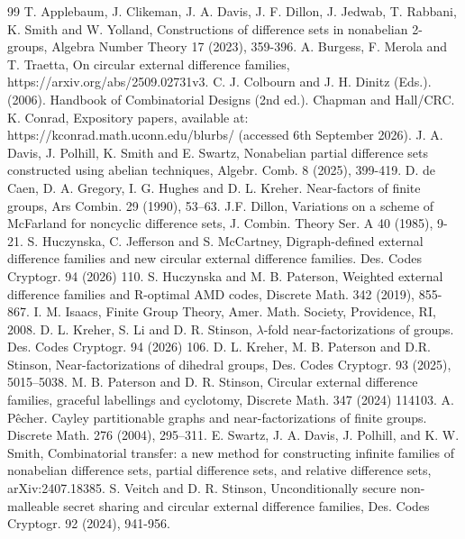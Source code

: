 \documentclass[12pt, a4paper]{article}
\theoremstyle{definition}
\begin{document}
\begin{thebibliography}{99}
 T. Applebaum, J. Clikeman, J. A.  Davis, J. F. Dillon, J. Jedwab, T. Rabbani, K. Smith and W. Yolland, Constructions of difference sets in nonabelian 2-groups, Algebra Number Theory 17 (2023), 359-396.
 A. Burgess, F. Merola and T. Traetta, On circular external difference families,  https://arxiv.org/abs/2509.02731v3.
C. J. Colbourn and J. H. Dinitz (Eds.). (2006). Handbook of Combinatorial Designs (2nd ed.). Chapman and Hall/CRC. 
 K. Conrad, Expository papers, available at: https://kconrad.math.uconn.edu/blurbs/ (accessed 6th September 2026).
 J. A. Davis, J. Polhill, K. Smith and E. Swartz, Nonabelian partial difference sets constructed using abelian techniques, Algebr. Comb. 8 (2025), 399-419.
 D. de Caen, D. A. Gregory, I. G. Hughes and D. L. Kreher. Near-factors of finite groups, Ars Combin. 29 (1990), 53–63.
J.F. Dillon,
Variations on a scheme of McFarland for noncyclic difference sets,
J. Combin. Theory Ser. A
40 (1985), 9-21.
S. Huczynska, C. Jefferson and S. McCartney, Digraph-defined external difference families and new circular external difference families. Des. Codes Cryptogr. 94 (2026) 110.
 S. Huczynska and M. B. Paterson, Weighted external difference families and R-optimal AMD
codes, Discrete Math. 342 (2019), 855-867.
 I. M. Isaacs, Finite Group Theory, Amer. Math. Society, Providence, RI, 2008.
 D. L. Kreher, S. Li and D. R. Stinson, $\lambda$-fold near-factorizations of groups. Des. Codes Cryptogr. 94 (2026) 106. 
 D. L. Kreher, M. B. Paterson and D.R. Stinson, Near-factorizations of dihedral groups, Des. Codes Cryptogr. 93 (2025), 5015--5038.
 M. B. Paterson and D. R. Stinson,
Circular external difference families, graceful labellings and cyclotomy, Discrete Math. 347 (2024) 114103.
 A. P\^echer. Cayley partitionable graphs and near-factorizations of finite groups. Discrete Math. 276 (2004), 295–311.
 E. Swartz, J. A. Davis, J. Polhill, and K. W. Smith, Combinatorial transfer: a new method for constructing infinite families of nonabelian difference sets, partial difference sets, and relative difference sets, arXiv:2407.18385.
 S. Veitch and D. R. Stinson, Unconditionally secure non-malleable secret sharing and
circular external difference families, Des. Codes Cryptogr. 92 (2024), 941-956.
\end{thebibliography}
\end{document}
